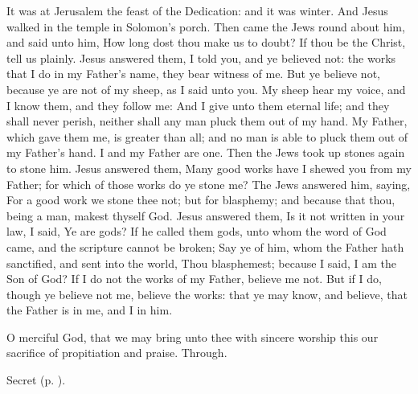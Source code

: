  It was at Jerusalem the feast of the Dedication: and it was winter. And Jesus walked in the temple in Solomon's porch. Then came the Jews round about him, and said unto him, How long dost thou make us to doubt? If thou be the Christ, tell us plainly. Jesus answered them, I told you, and ye believed not: the works that I do in my Father's name, they bear witness of me. But ye believe not, because ye are not of my sheep, as I said unto you. My sheep hear my voice, and I know them, and they follow me: And I give unto them eternal life; and they shall never perish, neither shall any man pluck them out of my hand. My Father, which gave them me, is greater than all; and no man is able to pluck them out of my Father's hand. I and my Father are one. Then the Jews took up stones again to stone him. Jesus answered them, Many good works have I shewed you from my Father; for which of those works do ye stone me? The Jews answered him, saying, For a good work we stone thee not; but for blasphemy; and because that thou, being a man, makest thyself God. Jesus answered them, Is it not written in your law, I said, Ye are gods? If he called them gods, unto whom the word of God came, and the scripture cannot be broken; Say ye of him, whom the Father hath sanctified, and sent into the world, Thou blasphemest; because I said, I am the Son of God? If I do not the works of my Father, believe me not. But if I do, though ye believe not me, believe the works: that ye may know, and believe, that the Father is in me, and I in him.


\vspace{-0.2\baselineskip}

\secret

\vspace{-0.1\baselineskip}

 O merciful God, that we may bring unto thee with sincere worship this our sacrifice of propitiation and praise. Through.


\begin{rubric}
     Secret  (p. \pageref{AshWednesdayMassSecret}).
\end{rubric}



